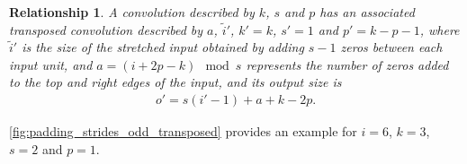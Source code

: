 \documentclass{report}
\newtheorem{relationship}{Relationship}
\begin{document}
\begin{relationship}\label{rel:padding_strides_transposed_odd}
A convolution described by $k$, $s$ and $p$ has an associated transposed
convolution described by $a$, $\tilde{i}'$, $k' = k$, $s' = 1$ and $p' = k - p -
1$, where $\tilde{i}'$ is the size of the stretched input obtained by adding $s
- 1$ zeros between each input unit, and $a = (i + 2p - k) \mod s$ represents the
number of zeros added to the top and right edges of the input, and its output
size is
\begin{equation*}
\begin{split}
    o' = s (i' - 1) + a + k - 2p.
\end{split}
\end{equation*}
\end{relationship}

\autoref{fig:padding_strides_odd_transposed} provides an example for $i = 6$, $k
= 3$, $s = 2$ and $p = 1$.
\end{document}
